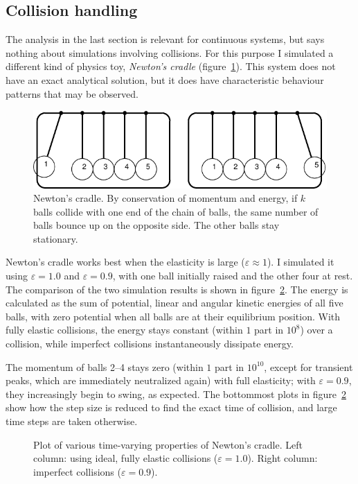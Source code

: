 \subsection{Collision handling\label{evalCollisions}}

The analysis in the last section is relevant for continuous systems, but says nothing about
simulations involving collisions. For this purpose I simulated a different kind of physics toy,
\emph{Newton's cradle} (figure~\ref{cradleFigure}). This system does not have an exact analytical
solution, but it does have characteristic behaviour patterns that may be observed.

\begin{figure}
\centerline{\includegraphics{figures/cradle}}
\caption{Newton's cradle. By conservation of momentum and energy, if $k$ balls collide with one
    end of the chain of balls, the same number of balls bounce up on the opposite side. The other
    balls stay stationary.\label{cradleFigure}}
\end{figure}

Newton's cradle works best when the elasticity is large ($\varepsilon \approx 1$). I simulated
it using $\varepsilon = 1.0$ and $\varepsilon = 0.9$, with one ball initially raised and the other
four at rest. The comparison of the two simulation results is shown in figure~\ref{cradlePlots}.
The energy is calculated as the sum of potential, linear and angular kinetic energies of all five
balls, with zero potential when all balls are at their equilibrium position. With fully elastic
collisions, the energy stays constant (within $1$ part in $10^8$) over a collision, while
imperfect collisions instantaneously dissipate energy.

The momentum of balls 2--4 stays zero (within $1$ part in $10^{10}$, except for transient peaks,
which are immediately neutralized again) with full elasticity; with $\varepsilon = 0.9$, they
increasingly begin to swing, as expected. The bottommost plots in figure~\ref{cradlePlots}
show how the step size is reduced to find the exact time of collision, and large time steps
are taken otherwise.

\begin{figure}
\centerline{}
\caption{Plot of various time-varying properties of Newton's cradle. Left column: using ideal,
    fully elastic collisions ($\varepsilon = 1.0$). Right column: imperfect collisions
    ($\varepsilon = 0.9$).\label{cradlePlots}}
\end{figure}

